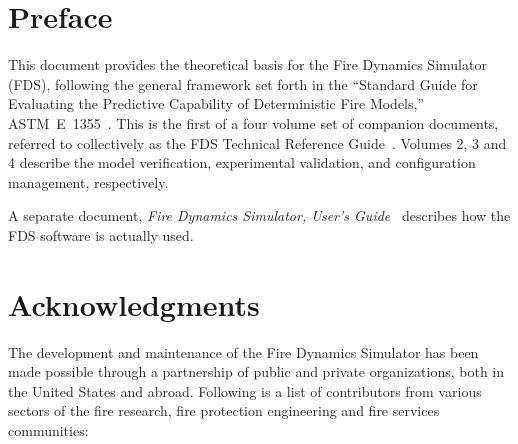 \documentclass[11pt]{book}
\begin{document}
\chapter{Preface}

This document provides the theoretical basis for the Fire Dynamics Simulator (FDS), following the general framework set forth in the ``Standard Guide for Evaluating the Predictive Capability of Deterministic Fire Models,'' ASTM~E~1355~\cite{ASTM:E1355}. This is the first of a four volume set of companion documents, referred to collectively as the FDS Technical Reference Guide~\cite{FDS_Tech_Guide}. Volumes 2, 3 and 4 describe the model verification, experimental validation, and configuration management, respectively.

A separate document, {\em Fire Dynamics Simulator, User's Guide}~\cite{FDS_Users_Guide} describes how the FDS software is actually used.




\chapter{Acknowledgments}

\label{acksection}

The development and maintenance of the Fire Dynamics Simulator has been made possible through
a partnership of public and private organizations, both in the United States and abroad. Following
is a list of contributors from various sectors of the fire research, fire protection engineering and
fire services communities:
\end{document}
